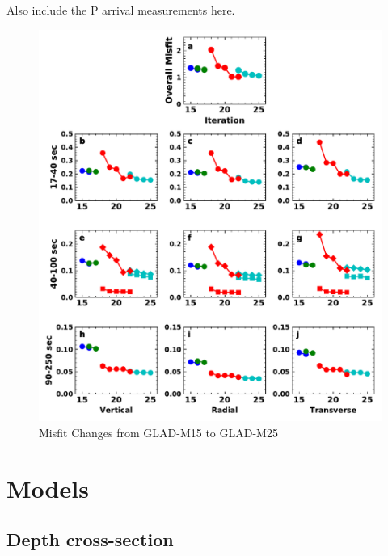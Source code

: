 \documentclass[extra,mreferee]{gji}
\begin{document}
Also include the P arrival measurements here.

\begin{figure}
\includegraphics[width=\textwidth]{figures/misfit.pdf}
\caption{Misfit Changes from GLAD-M15 to GLAD-M25}
\centering
\end{figure}


\section{Models}

\subsection{Depth cross-section}
\end{document}
